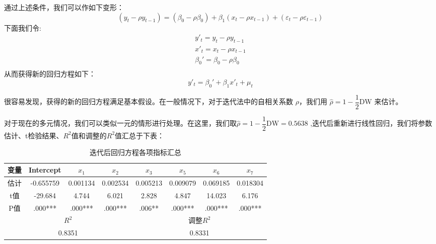 \documentclass[11pt]{article}
\begin{document}
通过上述条件，我们可以作如下变形：
$$
(y_t-\rho y_{t-1})=(\beta_0-\rho\beta_0)+\beta_1(x_t-\rho x_{t-1})+(\varepsilon_t-\rho\varepsilon_{t-1})
$$
下面我们令:
$$
\begin{array}{c}
     y'_t=y_t-\rho y_{t-1} \\
     x'_t=x_t-\rho x_{t-1}\\
     \beta_0'=\beta_0-\rho\beta_0\\
\end{array}
$$
从而获得新的回归方程如下：
$$
y'_t=\beta_0'+\beta_1x'_t+\mu_t
$$

很容易发现，获得的新的回归方程满足基本假设。在一般情况下，对于迭代法中的自相关系数 $\rho$，我们用 $\hat{\rho}=1-\dfrac{1}{2}\mathrm{DW}$ 来估计。

对于现在的多元情况，我们可以类似一元的情形进行处理。在这里，我们取$\hat{\rho}=1-\dfrac{1}{2}\mathrm{DW}=0.5638$ ,迭代后重新进行线性回归，我们将参数估计、t检验结果、$R^2$值和调整的$R^2$值汇总于下表：
\begin{table}[H]
	\centering
	\caption{迭代后回归方程各项指标汇总}
	\begin{tabular}{cccccccc}
		\hline\hline
		变量& Intercept& $x_1$    & $x_2$    & $x_3$   &   $x_5$    & $x_6$    & $x_7$  \\
		\hline
		估计	& -0.655759   &  0.001134  & 0.002534   & 0.005213   & 0.009079 & 0.069185   &0.018304\\
		t值& -29.684    &   4.744 &6.021   & 2.828     &  4.847   &  14.023   &  6.176  \\
		P值&  .000***
		&.000***  &.000***     &.006**    & .000***   &.000***     & .000***  \\
		\hline\hline
		\multicolumn{4}{c}{$R^2$} & \multicolumn{4}{c}{调整$R^2$} \\
		\hline
		\multicolumn{4}{c}{0.8351}& \multicolumn{4}{c}{0.8331}\\
		\hline\hline
	\end{tabular}
\end{table}
\end{document}
